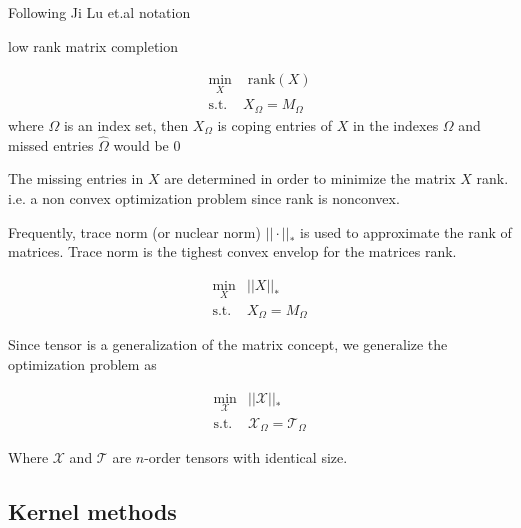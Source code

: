 \documentclass[letterpaper,12pt]{article}
\begin{document}
Following Ji Lu et.al \cite{Liu2013} notation

low rank matrix completion

\begin{equation} 
 \begin{split}
  \min_X & \text{ rank}(X)\\
  \text{s.t. } & X_\Omega = M_\Omega
 \end{split}
\end{equation}
where $\Omega$ is an index set, then $X_\Omega$ is coping entries of $X$ in the 
indexes $\Omega$ and missed entries $\hat{\Omega}$ would be $0$

The missing entries in $X$ are determined in order to minimize the matrix $X$ 
rank. i.e. a non convex optimization problem since rank is nonconvex.

Frequently, trace norm (or nuclear norm) $||\cdot ||_*$ is used to approximate 
the rank of matrices.
Trace norm is the tighest convex envelop for the matrices rank.

\begin{equation} 
 \begin{split}
  \min_X & ||X||_*\\
  \text{s.t. } & X_\Omega = M_\Omega
 \end{split}
\end{equation}

Since tensor is a generalization of the matrix concept, we generalize the 
optimization problem as

\begin{equation} 
 \begin{split}
  \min_{\mathcal{X}} & ||\mathcal{X}||_*\\
  \text{s.t. } & \mathcal{X}_\Omega = \mathcal{T}_\Omega
 \end{split}
\end{equation}

Where $\mathcal{X}$ and $\mathcal{T}$ are $n$-order tensors with identical size.






\subsection{Kernel methods}
\end{document}

